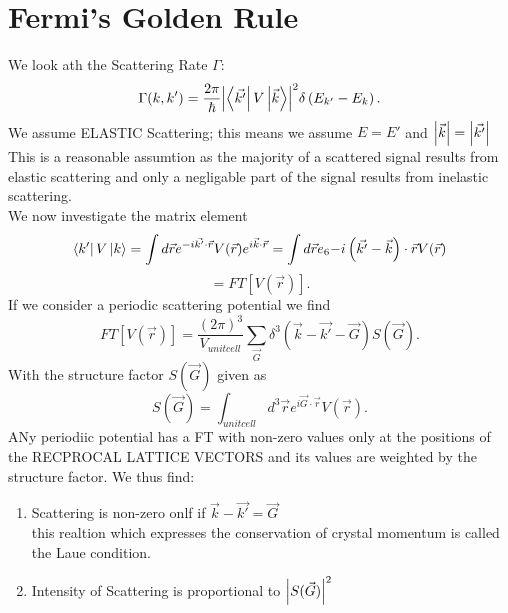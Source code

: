 \documentclass{report}
\begin{document}
\section{Fermi's Golden Rule}
We look ath the Scattering Rate $\Gamma$: \[
	\Gamma(k, k') = \frac{2\pi}{\hbar} \abs{\bra{\vec{k'}} V \ket{\vec{k}} }^2 \delta\left( E_{k'} - E_k \right)  
.\] 
We assume ELASTIC Scattering; this means we assume $E =E'$ and $\abs{\vec{k}} = \abs{\vec{k'}}$ \\
This is a reasonable assumtion as the majority of a scattered signal results from elastic scattering and only a negligable part of the signal results from inelastic scattering.\\
We now investigate the matrix element  \[
	\bra{k'} V \ket{k} = \int d\vec{r} e^{-i \vec{k'} \cdot \vec{r}} V(\vec{r}) e^{i \vec{k}\cdot\vec{r}} = \int d\vec{r} e_6{-i\left( \vec{k'} - \vec{k} \right) \cdot \vec{r}} V(\vec{r})
\] \[
= FT[V(\vec{r})]
.\]  
If we consider a periodic scattering potential we find \[
	FT[V(\vec{r})] = \frac{\left( 2\pi \right) ^3}{V_{unit cell}} \sum_{\vec{G}} \delta^3\left( \vec{k} - \vec{k'} - \vec{G} \right) S\left( \vec{G} \right) 	
.\] With the structure factor $S(\vec{G})$ given as \[
S(\vec{G}) =  \int_{unit cell} d^3\vec{r} e^{i \vec{G} \cdot \vec{r}} V(\vec{r})
.\] ANy periodiic potential has a FT with non-zero values only at the positions of the RECPROCAL LATTICE VECTORS and its values are weighted by the structure factor. We thus find:
\begin{enumerate}
	\item Scattering is non-zero onlf if $\vec{k} - \vec{k'} = \vec{G}$ \\
		this realtion which expresses the conservation of crystal momentum is called the Laue condition.
	\item Intensity of Scattering is proportional to $\abs{S(\vec{G})}^2$
\end{enumerate}
\end{document}
